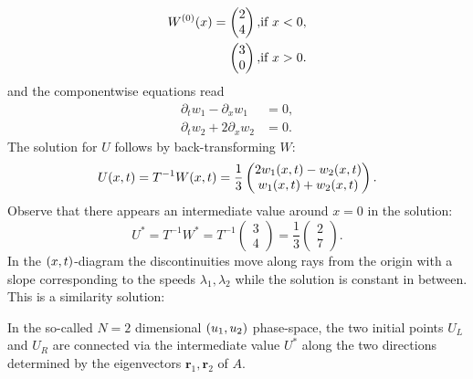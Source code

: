 \begin{example}
\begin{align*}
		W^{\parentheses*{0}}\parentheses*{x} = \begin{pmatrix}
			2\\
			4
		\end{pmatrix}, & \text{if }x < 0,\\
		\begin{pmatrix}
			3\\
			0
		\end{pmatrix}, & \text{if }x > 0.
	\end{align*}
	and the componentwise equations read
	\begin{align*}
		\partial_t w_1 - \partial_x w_1 &= 0,\\
		\partial_t w_2 + 2\partial_x w_2 &= 0.
	\end{align*}
	The solution for \(U\) follows by back-transforming \(W\):
	\[
		U\parentheses*{x, t} = T^{-1}W\parentheses*{x, t} = \frac{1}{3}\begin{pmatrix}
			2w_1\parentheses*{x, t} - w_2\parentheses*{x, t}\\
			w_1\parentheses*{x, t} + w_2\parentheses*{x, t}
		\end{pmatrix}.
	\]
	Observe that there appears an intermediate value around \(x = 0\) in the solution:
	\[
		U^* = T^{-1}W^* = T^{-1}\begin{pmatrix}
			3\\
			4
		\end{pmatrix} = \frac{1}{3}\begin{pmatrix}
			2\\
			7
		\end{pmatrix}.
	\]
	In the \(\parentheses*{x, t}\)-diagram the discontinuities move along rays from the origin with a slope corresponding to the speeds \(\lambda_1, \lambda_2\) while the solution is constant in between.
	This is a similarity solution:
	\begin{center}
	\end{center}
	In the so-called \(N = 2\) dimensional \(\parentheses*{u_1, u_2}\) phase-space, the two initial points \(U_L\) and \(U_R\) are connected via the intermediate value \(U^*\) along the two directions determined by the eigenvectors \(\bm{r}_1, \bm{r}_2\) of \(A\).
	\begin{center}
	\end{center}
\end{example}

